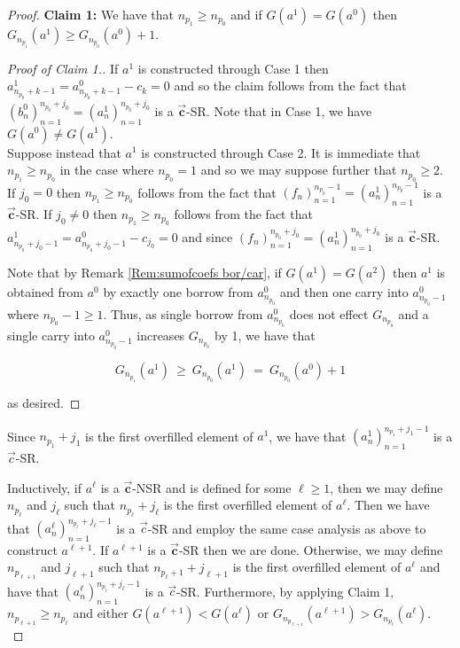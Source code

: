 \documentclass[]{interact}
\newcommand{\vtr}[1]{\vec{\mathbf{#1}}}
\theoremstyle{plain}
\numberwithin{equation}{section} %
\numberwithin{table}{section} %
\numberwithin{figure}{section}
\begin{document}
\begin{proof}
\noindent \textbf{Claim 1:} We have that $n_{p_1}\geq n_{p_0}$ and if $G(a^1)=G(a^0)$ then $G_{n_{p_1}}(a^1)\geq G_{n_{p_0}}(a^0)+1$.\\

\begin{proof}[Proof of Claim 1.]
    If $a^1$ is constructed through Case 1 then $a^{1}_{n_{p_0}+k-1}=a^{0}_{n_{p_0}+k-1}-c_k=0$ and so the claim follows from the fact that $(b^0_n)_{n=1}^{n_{p_0}+j_0}=(a^1_n)_{n=1}^{n_{p_0}+j_0}$ is a $\vtr{c}$-SR. Note that in Case 1, we have $G(a^0)\neq G(a^1)$.\\

    Suppose instead that $a^1$ is constructed through Case 2. It is immediate that $n_{p_1}\geq n_{p_0}$ in the case where $n_{p_0}=1$ and so we may suppose further that $n_{p_0}\geq 2$. If $j_0=0$ then $n_{p_1}\geq n_{p_0}$ follows from the fact that $(f_n)_{n=1}^{n_{p_0}-1}=(a_n^1)_{n=1}^{n_{p_0}-1}$ is a $\vtr{c}$-SR. If $j_0\neq 0$ then $n_{p_1}\geq n_{p_0}$ follows from the fact that $a^{1}_{n_{p_0}+j_0-1}=a^{0}_{n_{p_0}+j_0-1}-c_{j_0}=0$ and since $(f_n)_{n=1}^{n_{p_0}+j_0}=(a_n^1)_{n=1}^{n_{p_0}+j_0}$ is a $\vtr{c}$-SR.

    Note that by Remark \textcolor{blue}{\ref{Rem:sumofcoefs bor/car}}, if $G(a^1)=G(a^2)$ then $a^1$ is obtained from $a^0$ by exactly one borrow from $a^0_{n_{p_0}}$ and then one carry into $a^{0}_{n_{p_0}-1}$ where $n_{p_0}-1\geq 1$. Thus, as single borrow from $a^0_{n_{p_0}}$ does not effect $G_{n_{p_0}}$ and a single carry into $a^{0}_{n_{p_0}-1}$ increases $G_{n_{p_0}}$ by 1, we have that

    $$G_{n_{p_1}}(a^1)\ \geq\  G_{n_{p_0}}(a^1)\ =\ G_{n_{p_0}}(a^0)+1$$

    \noindent as desired.
\end{proof}

Since $n_{p_1}+j_1$ is the first overfilled element of $a^1$, we have that $(a_n^1)_{n=1}^{n_{p_1} + j_1-1}$ is a $\vec{c}$-SR.

Inductively, if $a^{\ell}$ is a $\vtr{c}$-NSR and is defined for some $\ell\geq 1$, then we may define $n_{p_{\ell}}$ and $j_{\ell}$ such that $n_{p_\ell}+j_\ell$ is the first overfilled element of $a^\ell$. Then we have that $(a_n^\ell)_{n=1}^{n_{p_\ell} + j_\ell-1}$ is a $\vec{c}$-SR and employ the same case analysis as above to construct $a^{\ell+1}$. If $a^{\ell+1}$ is a $\vtr{c}$-SR then we are done. Otherwise, we may define $n_{p_{\ell+1}}$ and $j_{\ell+1}$ such that $n_{p_\ell+1}+j_{\ell+1}$ is the first overfilled element of $a^\ell$ and have that $(a_n^\ell)_{n=1}^{n_{p_\ell} + j_\ell-1}$ is a $\vec{c}$-SR. Furthermore, by applying Claim 1, $n_{p_{\ell+1}}\geq n_{p_{\ell}}$ and either $G(a^{\ell+1})<G(a^{\ell})$ or $G_{n_{p_{\ell+1}}}(a^{\ell+1})>G_{n_{p_{\ell}}}(a^{\ell})$.\\


\end{proof}
\end{document}
